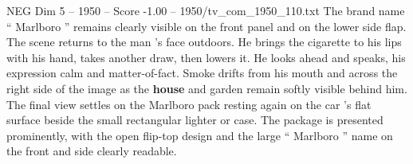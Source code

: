 \begin{textsample}{NEG Dim 5 – 1950 – Score -1.00 – 1950/tv\_com\_1950\_110.txt}
The brand name “ Marlboro ” remains clearly visible on the front panel and on the lower side flap.
The scene returns to the man ’s face outdoors.
He brings the cigarette to his lips with his hand, takes another draw, then lowers it.
He looks ahead and speaks, his expression calm and matter-of-fact.
Smoke drifts from his mouth and across the right side of the image as the \textbf{house} and garden remain softly visible behind him.
The final view settles on the Marlboro pack resting again on the car ’s flat surface beside the small rectangular lighter or case.
The package is presented prominently, with the open flip-top design and the large “ Marlboro ” name on the front and side clearly readable.

\end{textsample}
